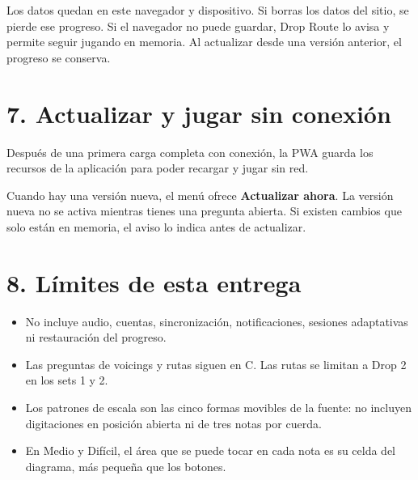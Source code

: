 \documentclass[a4paper,11pt]{article}
\providecommand{\tightlist}{\setlength{\itemsep}{2pt}\setlength{\parskip}{0pt}}
\begin{document}
Los datos quedan en este navegador y dispositivo. Si borras los datos
del sitio, se pierde ese progreso. Si el navegador no puede guardar,
Drop Route lo avisa y permite seguir jugando en memoria. Al actualizar
desde una versión anterior, el progreso se conserva.

\section{7. Actualizar y jugar sin
conexión}\label{7-actualizar-y-jugar-sin-conexiuxf3n}

Después de una primera carga completa con conexión, la PWA guarda los
recursos de la aplicación para poder recargar y jugar sin red.

Cuando hay una versión nueva, el menú ofrece \textbf{Actualizar ahora}.
La versión nueva no se activa mientras tienes una pregunta abierta. Si
existen cambios que solo están en memoria, el aviso lo indica antes de
actualizar.

\section{8. Límites de esta entrega}\label{8-luxedmites-de-esta-entrega}

\begin{itemize}
\tightlist
\item
  No incluye audio, cuentas, sincronización, notificaciones, sesiones
  adaptativas ni restauración del progreso.
\item
  Las preguntas de voicings y rutas siguen en C. Las rutas se limitan a
  Drop 2 en los sets 1 y 2.
\item
  Los patrones de escala son las cinco formas movibles de la fuente: no
  incluyen digitaciones en posición abierta ni de tres notas por cuerda.
\item
  En Medio y Difícil, el área que se puede tocar en cada nota es su
  celda del diagrama, más pequeña que los botones.
\end{itemize}
\end{document}

